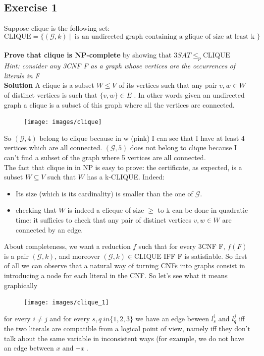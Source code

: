 \subsection{Exercise 1}
Suppose clique is the following set: \[\text{CLIQUE} = \{(\mathcal{G}, k) \ | \ \text{ is an undirected graph containing a glique of size at least k }\}\]\\
\textbf{Prove that clique is NP-complete} by showing that \(3SAT \leq_p \text{CLIQUE}\)\\
\textit{Hint: consider any 3CNF F as a graph whose vertices are the occurrences of literals in F}
\\
\textbf{Solution}
A clique is a subset \(W \leq V\) of its vertices such that any pair \(v,w \in W\) of distinct vertices is such that \(\{v,w\} \in E\) . In other words given an undirected graph a clique is a subset of this graph where all the vertices are connected.
\begin{figure}[H]
	\centerline{\texttt{[image: images/clique]}}
\end{figure}
So \((\mathcal{G},4)\) belong to clique because in w (pink) I can see that I have at least 4 vertices which are all connected.  \((\mathcal{G},5)\) does not belong to clique because I can't find a subset of the graph where 5 vertices are all connected.\\
The fact that clique in in NP is easy to prove: the certificate, as expected, is a subset \(W \subseteq V\) such that \(W\) has a k-CLIQUE. Indeed:
\begin{itemize}
	\item Its size (which is its cardinality) is smaller than the one of \(\mathcal{G}\).
	\item checking that \(W\) is indeed a clieque of size \(\geq\) to k can be done in quadratic time: it sufficies to check that any pair of distinct vertices \(v,w \in W\) are connected by an edge.
\end{itemize}
About completeness, we want a reduction \(f\) such that for every 3CNF F, \(f(F)\) is a pair \((\mathcal{G}, k)\), and moreover \((\mathcal{G}, k) \in \text{CLIQUE}\) IFF F is satisfiable. So first of all we can observe that a natural way of turning CNFs into graphs consist in introducing a node for each literal in the CNF. So let's see what it means graphically
\begin{figure}[H]
	\centerline{\texttt{[image: images/clique\_1]}}
\end{figure}
for every \(i \ne j\) and for every \(s,q \ in \{1,2,3\}\) we have an edge beween \(l_s^i\) and \(l_q^j\) iff the two literals are compatible from a logical point of view, namely iff they don't talk about the same variable in inconsistent ways (for example, we do not have an edge between \(x\) and \(\lnot x\) . \\
